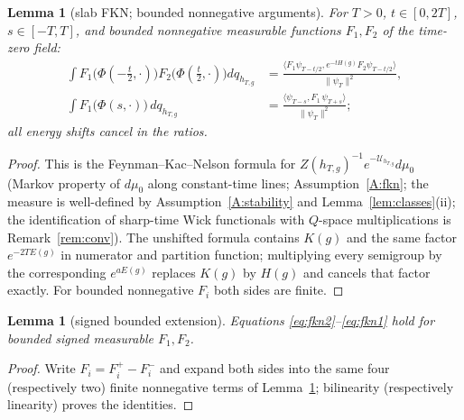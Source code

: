 \documentclass[11pt,a4paper]{article}
\theoremstyle{plain}
\newtheorem{lemma}[theorem]{Lemma}
\theoremstyle{definition}
\theoremstyle{plain}
\theoremstyle{definition}
\newcommand{\ip}[2]{\langle #1,#2\rangle}
\begin{document}
\begin{lemma}[slab FKN; bounded nonnegative arguments]\label{lem:slabFKN}
For $T>0$, $t\in[0,2T]$, $s\in[-T,T]$, and bounded nonnegative measurable functions
$F_1,F_2$ of the time-zero field:
\begin{align}
  \int F_1\bigl(\Phi(-\tfrac t2,\cdot)\bigr)F_2\bigl(\Phi(\tfrac t2,\cdot)\bigr)dq_{h_{T,g}}
  &=\frac{\ip{F_1\psi_{T-t/2}}{e^{-tH(g)}F_2\psi_{T-t/2}}}{\|\psi_T\|^2},\label{eq:fkn2}\\
  \int F_1\bigl(\Phi(s,\cdot)\bigr)\,dq_{h_{T,g}}
  &=\frac{\ip{\psi_{T-s}}{F_1\,\psi_{T+s}}}{\|\psi_T\|^2};\label{eq:fkn1}
\end{align}
all energy shifts cancel in the ratios.
\end{lemma}

\begin{proof}
This is the Feynman--Kac--Nelson formula for $Z(h_{T,g})^{-1}e^{-\mathcal U_{h_{T,g}}}d\mu_0$
(Markov property of $d\mu_0$ along constant-time lines; Assumption~\ref{A:fkn}; the measure
is well-defined by Assumption~\ref{A:stability} and Lemma~\ref{lem:classes}(ii); the
identification of sharp-time Wick functionals with $Q$-space multiplications is
Remark~\ref{rem:conv}). The unshifted formula contains $K(g)$ and the same factor
$e^{-2TE(g)}$ in numerator and partition function; multiplying every semigroup by the
corresponding $e^{aE(g)}$ replaces $K(g)$ by $H(g)$ and cancels that factor exactly. For
bounded nonnegative $F_i$ both sides are finite.
\end{proof}

\begin{lemma}[signed bounded extension]\label{lem:slabsigned}
Equations \eqref{eq:fkn2}--\eqref{eq:fkn1} hold for bounded signed measurable $F_1,F_2$.
\end{lemma}

\begin{proof}
Write $F_i=F_i^+-F_i^-$ and expand both sides into the same four (respectively two) finite
nonnegative terms of Lemma~\ref{lem:slabFKN}; bilinearity (respectively linearity) proves
the identities.
\end{proof}
\end{document}
